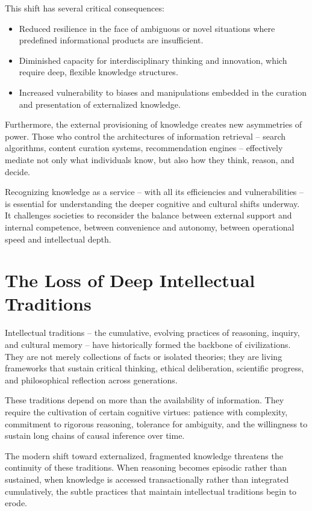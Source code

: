 This shift has several critical consequences: 

\begin{itemize}
	\item Reduced resilience in the face of ambiguous or novel situations where predefined informational products are insufficient.
	\item Diminished capacity for interdisciplinary thinking and innovation, which require deep, flexible knowledge structures.
	\item Increased vulnerability to biases and manipulations embedded in the curation and presentation of externalized knowledge.
\end{itemize}

Furthermore, the external provisioning of knowledge creates new
asymmetries of power. Those who control the architectures of information
retrieval -- search algorithms, content curation systems, recommendation
engines -- effectively mediate not only what individuals know, but also
how they think, reason, and decide.

Recognizing knowledge as a service -- with all its efficiencies and
vulnerabilities -- is essential for understanding the deeper cognitive
and cultural shifts underway. It challenges societies to reconsider the
balance between external support and internal competence, between
convenience and autonomy, between operational speed and intellectual
depth.


\section{The Loss of Deep Intellectual Traditions}

Intellectual traditions -- the cumulative, evolving practices of
reasoning, inquiry, and cultural memory -- have historically formed the
backbone of civilizations. They are not merely collections of facts or
isolated theories; they are living frameworks that sustain critical
thinking, ethical deliberation, scientific progress, and philosophical
reflection across generations.

These traditions depend on more than the availability of information.
They require the cultivation of certain cognitive virtues: patience with
complexity, commitment to rigorous reasoning, tolerance for ambiguity,
and the willingness to sustain long chains of causal inference over
time.

The modern shift toward externalized, fragmented knowledge threatens the
continuity of these traditions. When reasoning becomes episodic rather
than sustained, when knowledge is accessed transactionally rather than
integrated cumulatively, the subtle practices that maintain intellectual
traditions begin to erode.

